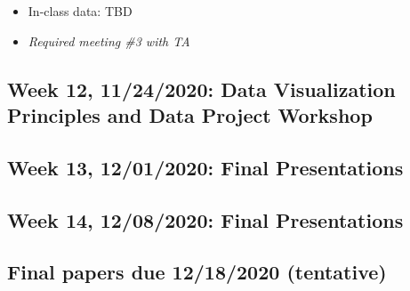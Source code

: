 \documentclass[11pt,]{article}
\providecommand{\tightlist}{%
  \setlength{\itemsep}{0pt}\setlength{\parskip}{0pt}}
\begin{document}
\begin{itemize}
\tightlist
\item
  In-class data: TBD
\item
  \emph{Required meeting \#3 with TA} \medskip
\end{itemize}

\hypertarget{week-12-11242020-data-visualization-principles-and-data-project-workshop}{%
\subsection{Week 12, 11/24/2020: Data Visualization Principles and Data
Project
Workshop}\label{week-12-11242020-data-visualization-principles-and-data-project-workshop}}

\medskip

\hypertarget{week-13-12012020-final-presentations}{%
\subsection{Week 13, 12/01/2020: Final
Presentations}\label{week-13-12012020-final-presentations}}

\medskip

\hypertarget{week-14-12082020-final-presentations}{%
\subsection{Week 14, 12/08/2020: Final
Presentations}\label{week-14-12082020-final-presentations}}

\medskip

\hypertarget{final-papers-due-12182020-tentative}{%
\subsection{Final papers due 12/18/2020
(tentative)}\label{final-papers-due-12182020-tentative}}
\end{document}
